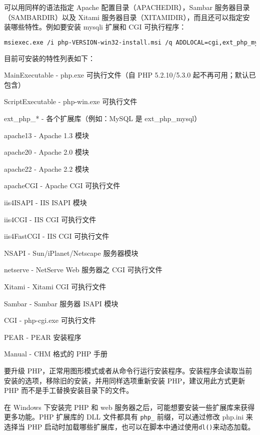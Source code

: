 可以用同样的语法指定 Apache 配置目录（APACHEDIR），Sambar 服务器目录（SAMBARDIR）以及 Xitami 服务器目录（XITAMIDIR），而且还可以指定安装哪些特性。例如要安装 mysqli 扩展和 CGI 可执行程序：

\begin{lstlisting}[language=bash]
msiexec.exe /i php-VERSION-win32-install.msi /q ADDLOCAL=cgi,ext_php_mysqli
\end{lstlisting}


目前可安装的特性列表如下：

\begin{compactitem}
\item MainExecutable - php.exe 可执行文件（自 PHP 5.2.10/5.3.0 起不再可用；默认已包含）
\item ScriptExecutable - php-win.exe 可执行文件
\item ext\_php\_* - 各个扩展库（例如：MySQL 是 ext\_php\_mysql）
\item apache13 - Apache 1.3 模块
\item apache20 - Apache 2.0 模块
\item apache22 - Apache 2.2 模块
\item apacheCGI - Apache CGI 可执行文件
\item iis4ISAPI - IIS ISAPI 模块
\item iis4CGI - IIS CGI 可执行文件
\item iis4FastCGI - IIS CGI 可执行文件
\item NSAPI - Sun/iPlanet/Netscape 服务器模块
\item netserve - NetServe Web 服务器之 CGI 可执行文件
\item Xitami - Xitami CGI 可执行文件
\item Sambar - Sambar 服务器 ISAPI 模块
\item CGI - php-cgi.exe 可执行文件
\item PEAR - PEAR 安装程序
\item Manual - CHM 格式的 PHP 手册
\end{compactitem}

要升级 PHP，正常用图形模式或者从命令行运行安装程序。安装程序会读取当前安装的选项，移除旧的安装，并用同样选项重新安装 PHP，建议用此方式更新 PHP 而不是手工替换安装目录下的文件。

在 Windows 下安装完 PHP 和 web 服务器之后，可能想要安装一些扩展库来获得更多功能。PHP 扩展库的 DLL 文件都具有 \texttt{php\_} 前缀，可以通过修改 php.ini 来选择当 PHP 启动时加载哪些扩展库，也可以在脚本中通过使用\texttt{dl()}来动态加载。



